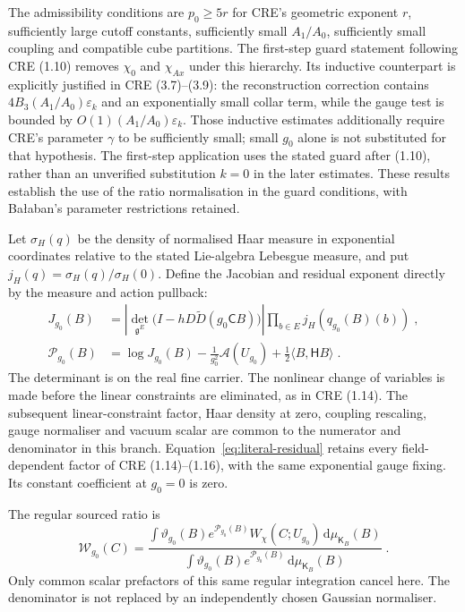 \documentclass[11pt]{article}
\newcommand{\dd}{\mathrm{d}}
\begin{document}
The admissibility conditions are $p_0\geq 5r$ for CRE's geometric exponent $r$, sufficiently large cutoff constants, sufficiently small $A_1/A_0$, sufficiently small coupling and compatible cube partitions. The first-step guard statement following CRE (1.10) removes $\chi_0$ and $\chi_{Ax}$ under this hierarchy. Its inductive counterpart is explicitly justified in CRE (3.7)--(3.9): the reconstruction correction contains $4B_3(A_1/A_0)\varepsilon_k$ and an exponentially small collar term, while the gauge test is bounded by $O(1)(A_1/A_0)\varepsilon_k$. Those inductive estimates additionally require CRE's parameter $\gamma$ to be sufficiently small; small $g_0$ alone is not substituted for that hypothesis. The first-step application uses the stated guard after (1.10), rather than an unverified substitution $k=0$ in the later estimates. These results establish the use of the ratio normalisation in the guard conditions, with Ba{\l}aban's parameter restrictions retained.

Let $\sigma_H(q)$ be the density of normalised Haar measure in exponential coordinates relative to the stated Lie-algebra Lebesgue measure, and put $j_H(q)=\sigma_H(q)/\sigma_H(0)$. Define the Jacobian and residual exponent directly by the measure and action pullback:
\begin{equation}\label{eq:literal-residual}
    \begin{aligned}
        J_{g_0}(B)&=
            \left|\det_{\mathfrak g^E}
                \bigl(I-hD\widetilde D(g_0\mathsf C B)\bigr)\right|
            \prod_{b\in E}j_H(q_{g_0}(B)(b))\;,\\
        \mathcal P_{g_0}(B)&=\log J_{g_0}(B)
            -\frac{1}{g_0^2}\mathscr A(U_{g_0})
            +\frac{1}{2}\langle B,\mathsf H B\rangle\;.
    \end{aligned}
\end{equation}
The determinant is on the real fine carrier. The nonlinear change of variables is made before the linear constraints are eliminated, as in CRE (1.14). The subsequent linear-constraint factor, Haar density at zero, coupling rescaling, gauge normaliser and vacuum scalar are common to the numerator and denominator in this branch. Equation~\eqref{eq:literal-residual} retains every field-dependent factor of CRE (1.14)--(1.16), with the same exponential gauge fixing. Its constant coefficient at $g_0=0$ is zero.

The regular sourced ratio is
\begin{equation}\label{eq:flat-ratio}
    \mathcal W_{g_0}(C)=
        \frac{\displaystyle\int
            \vartheta_{g_0}(B)e^{\mathcal P_{g_0}(B)}
            W_\chi(C;U_{g_0})\,\dd\mu_{\mathsf K_B}(B)}
        {\displaystyle\int
            \vartheta_{g_0}(B)e^{\mathcal P_{g_0}(B)}
            \,\dd\mu_{\mathsf K_B}(B)}\;.
\end{equation}
Only common scalar prefactors of this same regular integration cancel here. The denominator is not replaced by an independently chosen Gaussian normaliser.
\end{document}
